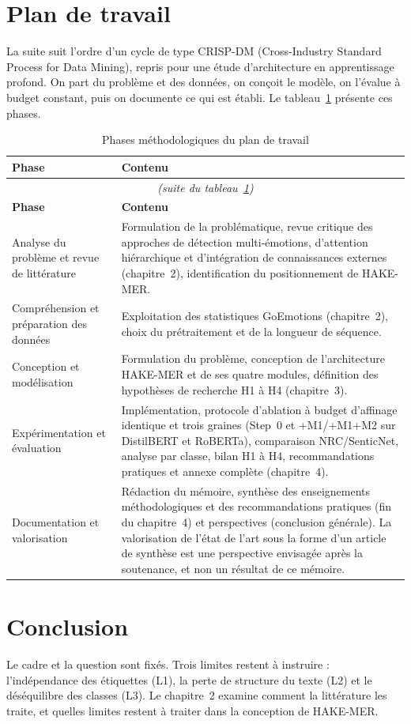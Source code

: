 \section{Plan de travail}
\label{sec:plan-travail}

La suite suit l'ordre d'un cycle de type CRISP-DM (Cross-Industry
Standard Process for Data Mining), repris pour une étude d'architecture
en apprentissage profond. On part du problème et des données, on conçoit
le modèle, on l'évalue à budget constant, puis on documente ce qui est
établi. Le tableau~\ref{tab:plan-travail} présente ces phases.

{\small
\renewcommand{\arraystretch}{1.12}
\begin{longtable}{|p{3.6cm}|p{10.4cm}|}
\caption{Phases méthodologiques du plan de travail}
\label{tab:plan-travail} \\
\hline
\textbf{Phase} & \textbf{Contenu} \\
\hline
\endfirsthead
\multicolumn{2}{|c|}{\emph{(suite du tableau~\ref{tab:plan-travail})}} \\
\hline
\textbf{Phase} & \textbf{Contenu} \\
\hline
\endhead
\hline
\endfoot
\hline
\endlastfoot
Analyse du problème et revue de littérature &
Formulation de la problématique, revue critique des approches de
détection multi-émotions, d'attention hiérarchique et d'intégration de
connaissances externes (chapitre~2), identification du positionnement de
HAKE-MER. \\
\hline
Compréhension et préparation des données &
Exploitation des statistiques GoEmotions (chapitre~2), choix du
prétraitement et de la longueur de séquence. \\
\hline
Conception et modélisation &
Formulation du problème, conception de l'architecture HAKE-MER et de ses
quatre modules, définition des hypothèses de recherche H1 à H4
(chapitre~3). \\
\hline
Expérimentation et évaluation &
Implémentation, protocole d'ablation à budget d'affinage identique et trois
graines (Step~0 et +M1/+M1+M2 sur DistilBERT et RoBERTa), comparaison
NRC/SenticNet, analyse par classe, bilan H1 à H4, recommandations pratiques
et annexe complète (chapitre~4). \\
\hline
Documentation et valorisation &
Rédaction du mémoire, synthèse des enseignements méthodologiques et des
recommandations pratiques (fin du chapitre~4) et perspectives
(conclusion générale). La valorisation de l'état de l'art sous la forme
d'un article de synthèse est une perspective envisagée après la
soutenance, et non un résultat de ce mémoire. \\
\hline
\end{longtable}
}

\section*{Conclusion}

Le cadre et la question sont fixés. Trois limites restent à instruire :
l'indépendance des étiquettes (L1), la perte de structure du texte (L2)
et le déséquilibre des classes (L3). Le chapitre~2 examine comment la
littérature les traite, et quelles limites restent à traiter dans
la conception de HAKE-MER.
